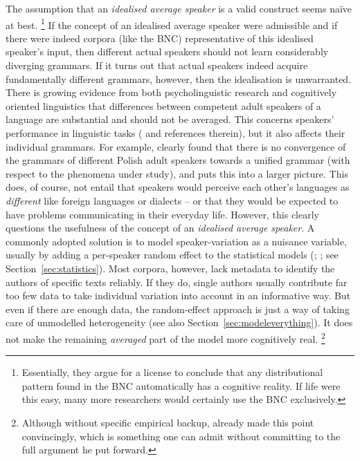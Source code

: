 The assumption that an \textit{idealised average speaker} is a valid construct seems naïve at best.%
\footnote{Essentially, they argue for a license to conclude that any distributional pattern found in the BNC automatically has a cognitive reality.
If life were this easy, many more researchers would certainly use the BNC exclusively.}
If the concept of an idealised average speaker were admissible and if there were indeed corpora (like the BNC) representative of this idealised speaker's input, then different actual speakers should not learn considerably diverging grammars.
If it turns out that actual speakers indeed acquire fundamentally different grammars, however, then the idealisation is unwarranted.
There is growing evidence from both psycholinguistic research and cognitively oriented linguistics that differences between competent adult speakers of a language are substantial and should not be averaged.
This concerns speakers' performance in linguistic tasks (\citealt{HuettigJanse2016} and references therein), but it also affects their individual grammars.
For example, \citet{Dabrowska2008,Dabrowska2012} clearly found that there is no convergence of the grammars of different Polish adult speakers towards a unified grammar (with respect to the phenomena under study), and \citet{Dabrowska2015} puts this into a larger picture.
This does, of course, not entail that speakers would perceive each other's languages as \textit{different} like foreign languages or dialects -- or that they would be expected to have problems communicating in their everyday life.
However, this clearly questions the usefulness of the concept of an \textit{idealised average speaker}.
A commonly adopted solution is to model speaker-variation as a nuisance variable, usually by adding a per-speaker random effect to the statistical models (\citealt{Gries2015}; \citealt{Schaefer2018}; see Section~\ref{sec:statistics}).
Most corpora, however, lack metadata to identify the authors of specific texts reliably.
If they do, single authors usually contribute far too few data to take individual variation into account in an informative way.
But even if there are enough data, the random-effect approach is just a way of taking care of unmodelled heterogeneity (see also Section~\ref{sec:modeleverything}).
It does not make the remaining \textit{averaged} part of the model more cognitively real.%
\footnote{Although without specific empirical backup, \citet[695--698]{Newmeyer2003} already made this point convincingly, which is something one can admit without committing to the full argument he put forward.}

